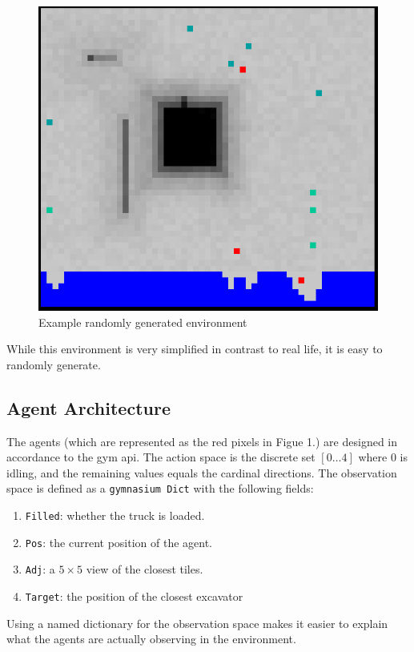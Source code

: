 \documentclass[conference]{IEEEtran}
\begin{document}
\begin{figure}[h!]
	\includegraphics[width=\columnwidth]{graphs/example_env.png}
	\caption{Example randomly generated environment}
\end{figure}

While this environment is very simplified in contrast to real life, it is easy to randomly generate.


\subsection{Agent Architecture}
The agents (which are represented as the red pixels in Figue 1.) are designed in accordance to the gym api.
The action space is the discrete set $[0 \ldots 4]$ where $0$ is idling, and the remaining values equals the cardinal directions.
The observation space is defined as a \texttt{gymnasium Dict} with the following fields:
\begin{enumerate}
	\item \texttt{Filled}: whether the truck is loaded.
	\item \texttt{Pos}: the current position of the agent.
	\item \texttt{Adj}: a $5\times 5$ view of the closest tiles.
	\item \texttt{Target}: the position of the closest excavator
\end{enumerate}
Using a named dictionary for the observation space makes it easier to explain what the agents are actually observing in the environment.
\end{document}
